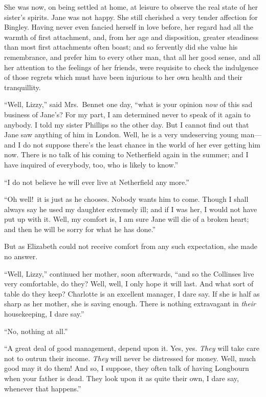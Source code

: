 \documentclass[12pt,english]{book}
\begin{document}
She was now, on being settled at home, at leisure to observe the real
state of her sister's spirits. Jane was not happy. She still cherished
a very tender affection for Bingley. Having never even fancied herself
in love before, her regard had all the warmth of first attachment,
and, from her age and disposition, greater steadiness than most first
attachments often boast; and so fervently did she value his remembrance,
and prefer him to every other man, that all her good sense, and all
her attention to the feelings of her friends, were requisite to check
the indulgence of those regrets which must have been injurious to
her own health and their tranquillity.

{}``Well, Lizzy,'' said Mrs.\ Bennet one day, {}``what is your
opinion \textit{now} of this sad business of Jane's? For my part,
I am determined never to speak of it again to anybody. I told my sister
Phillips so the other day. But I cannot find out that Jane saw anything
of him in London. Well, he is a very undeserving young man\mbox{---}and
I do not suppose there's the least chance in the world of her ever
getting him now. There is no talk of his coming to Netherfield again
in the summer; and I have inquired of everybody, too, who is likely
to know.''

{}``I do not believe he will ever live at Netherfield any more.''

{}``Oh well!\ it is just as he chooses. Nobody wants him to come.
Though I shall always say he used my daughter extremely ill; and if
I was her, I would not have put up with it. Well, my comfort is, I
am sure Jane will die of a broken heart; and then he will be sorry
for what he has done.''

But as Elizabeth could not receive comfort from any such expectation,
she made no answer.

{}``Well, Lizzy,'' continued her mother, soon afterwards, {}``and
so the Collinses live very comfortable, do they? Well, well, I only
hope it will last. And what sort of table do they keep? Charlotte
is an excellent manager, I dare say. If she is half as sharp as her
mother, she is saving enough. There is nothing extravagant in \textit{their}
housekeeping, I dare say.''

{}``No, nothing at all.''

{}``A great deal of good management, depend upon it. Yes, yes. \textit{They}
will take care not to outrun their income. \textit{They} will never
be distressed for money. Well, much good may it do them! And so, I
suppose, they often talk of having Longbourn when your father is dead.
They look upon it as quite their own, I dare say, whenever that happens.''
\end{document}
